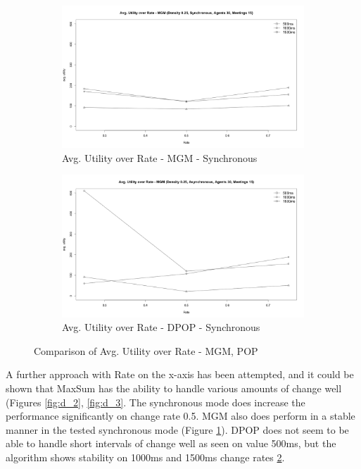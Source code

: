 \begin{figure}[H]
\centering
\begin{subfigure}{0.5\textwidth}
  \centering
  \includegraphics[width=1\linewidth]{graphics/experiments/dynamic/d_4.png}
  \caption{Avg. Utility over Rate - MGM - Synchronous}
  \label{fig:d_4}
\end{subfigure}%
\begin{subfigure}{0.5\textwidth}
  \centering
  \includegraphics[width=1\linewidth]{graphics/experiments/dynamic/d_5.png}
  \caption{Avg. Utility over Rate - DPOP - Synchronous}
  \label{fig:d_5}
\end{subfigure}
\caption{Comparison of Avg. Utility over Rate - MGM, POP}
\label{fig:test}
\end{figure}

A further approach with Rate on the x-axis has been attempted, and it could be shown that MaxSum has the ability to handle various amounts of change well (Figures \ref{fig:d_2}, \ref{fig:d_3}. The synchronous mode does increase the performance significantly on change rate 0.5. MGM also does perform in a stable manner in the tested synchronous mode (Figure \ref{fig:d_4}). DPOP does not seem to be able to handle short intervals of change well as seen on value 500ms, but the algorithm shows stability on 1000ms and 1500ms change rates \ref{fig:d_5}.






